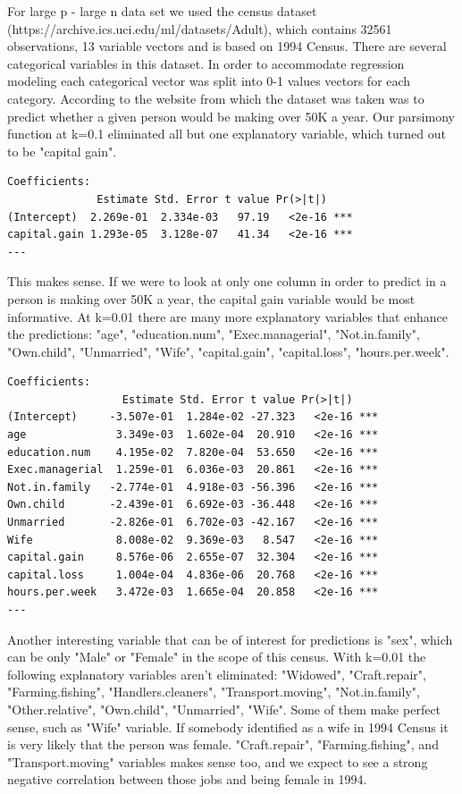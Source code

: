 \documentclass[letter]{article}
\begin{document}
For large p - large n data set we used the census dataset \\ (https://archive.ics.uci.edu/ml/datasets/Adult), which contains 32561 observations, 13 variable vectors and is based on 1994 Census. There are several categorical variables in this dataset. In order to accommodate regression modeling each categorical vector was split into 0-1 values vectors for each category. According to the website from which the dataset was taken was to predict whether a given person would be making over 50K a year.  Our parsimony function at k=0.1 eliminated all but one explanatory variable, which turned out to be "capital gain". 
\begin{verbatim}
Coefficients:
              Estimate Std. Error t value Pr(>|t|)    
(Intercept)  2.269e-01  2.334e-03   97.19   <2e-16 ***
capital.gain 1.293e-05  3.128e-07   41.34   <2e-16 ***
---

\end{verbatim}

This makes sense. If we were to look at only one column in order to predict in a person is making over 50K a year, the capital gain variable would be most informative. At k=0.01 there are many more explanatory variables that enhance the predictions:  "age", "education.num", "Exec.managerial", "Not.in.family", "Own.child", "Unmarried", "Wife", "capital.gain", "capital.loss", "hours.per.week".

\begin{verbatim}
Coefficients:
                  Estimate Std. Error t value Pr(>|t|)    
(Intercept)     -3.507e-01  1.284e-02 -27.323   <2e-16 ***
age              3.349e-03  1.602e-04  20.910   <2e-16 ***
education.num    4.195e-02  7.820e-04  53.650   <2e-16 ***
Exec.managerial  1.259e-01  6.036e-03  20.861   <2e-16 ***
Not.in.family   -2.774e-01  4.918e-03 -56.396   <2e-16 ***
Own.child       -2.439e-01  6.692e-03 -36.448   <2e-16 ***
Unmarried       -2.826e-01  6.702e-03 -42.167   <2e-16 ***
Wife             8.008e-02  9.369e-03   8.547   <2e-16 ***
capital.gain     8.576e-06  2.655e-07  32.304   <2e-16 ***
capital.loss     1.004e-04  4.836e-06  20.768   <2e-16 ***
hours.per.week   3.472e-03  1.665e-04  20.858   <2e-16 ***
---
\end{verbatim}

Another interesting variable that can be of interest for predictions is "sex", which can be only "Male" or "Female" in the scope of this census. With k=0.01 the following explanatory variables aren't eliminated: "Widowed", "Craft.repair", "Farming.fishing", "Handlers.cleaners", "Transport.moving", "Not.in.family", "Other.relative", "Own.child", "Unmarried", "Wife". Some of them make perfect sense, such as "Wife" variable. If somebody identified as a wife in 1994 Census it is very likely that the person was female. "Craft.repair", "Farming.fishing", and  "Transport.moving" variables makes sense too, and we expect to see a strong negative correlation between those jobs and being female in 1994.
\end{document}
